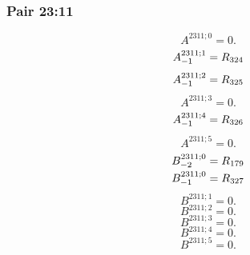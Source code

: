 \documentclass[11pt,a4paper]{article}
\begin{document}
\subsubsection{Pair 23:11}
\begin{equation}
A^{2311;0}=0.
\label{eq:cat-map-426}
\end{equation}
\begin{equation}
\shortstack[l]{$\displaystyle A^{2311;1}_{-1}=R_{324}$}
\label{eq:cat-map-427}
\end{equation}
\begin{equation}
\shortstack[l]{$\displaystyle A^{2311;2}_{-1}=R_{325}$}
\label{eq:cat-map-428}
\end{equation}
\begin{equation}
A^{2311;3}=0.
\label{eq:cat-map-429}
\end{equation}
\begin{equation}
\shortstack[l]{$\displaystyle A^{2311;4}_{-1}=R_{326}$}
\label{eq:cat-map-430}
\end{equation}
\begin{equation}
A^{2311;5}=0.
\label{eq:cat-map-431}
\end{equation}
\begin{equation}
\shortstack[l]{$\displaystyle B^{2311;0}_{-2}=R_{179}$\\
$\displaystyle B^{2311;0}_{-1}=R_{327}$}
\label{eq:cat-map-432}
\end{equation}
\begin{equation}
B^{2311;1}=0.
\label{eq:cat-map-433}
\end{equation}
\begin{equation}
B^{2311;2}=0.
\label{eq:cat-map-434}
\end{equation}
\begin{equation}
B^{2311;3}=0.
\label{eq:cat-map-435}
\end{equation}
\begin{equation}
B^{2311;4}=0.
\label{eq:cat-map-436}
\end{equation}
\begin{equation}
B^{2311;5}=0.
\label{eq:cat-map-437}
\end{equation}
\end{document}
